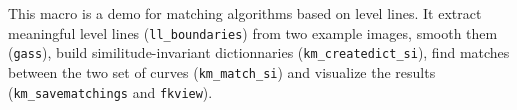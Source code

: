 This macro is a demo for matching algorithms based on level lines. 
It extract meaningful level lines (\verb+ll_boundaries+) from two example
images, smooth them (\verb+gass+), build similitude-invariant dictionnaries
(\verb+km_createdict_si+), find matches between the two set of curves
(\verb+km_match_si+) and visualize the results (\verb+km_savematchings+
and \verb+fkview+).
